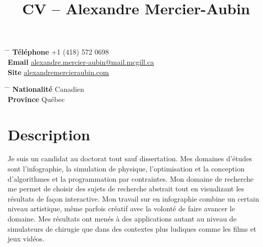 \documentclass[10pt]{article} %
\begin{document}

\title{CV -- Alexandre Mercier-Aubin} %


\parbox{0.5\textwidth}{ %
\begin{tabbing} %
\hspace{3cm} \= \hspace{4cm} \= \kill %
{\bf Téléphone} \> +1 (418) 572 0698 \\ %
{\bf Email} \> \href{mailto:alexandre.mercier-aubin@mail.mcgill.ca}{alexandre.mercier-aubin@mail.mcgill.ca} \\ %
{\bf Site} \> \href{https://alexandremercieraubin.com}{alexandremercieraubin.com} \\
\end{tabbing}}
\hfill %
\parbox{0.5\textwidth}{ %
\begin{tabbing} %
\hspace{3cm} \= \hspace{4cm} \= \kill %
{\bf Nationalité} \> Canadien \\ %
{\bf Province} \> {Québec}\\
\end{tabbing}}

\vspace{-0.7cm} 

\justifying

\section{Description}

Je suis un candidat au doctorat tout sauf dissertation. Mes domaines d'études sont l'infographie, la simulation de physique, l'optimisation et la conception
d'algorithmes et la programmation par contraintes. Mon domaine de recherche me permet de choisir des sujets de recherche abstrait tout en visualizant les résultats de façon interactive. 
Mon travail sur en infographie combine un certain niveau artistique, même parfois créatif avec la volonté de faire avancer le domaine. Mes résultats ont menés à des applications autant au niveau de simulateurs de chirugie que dans des contextes plus ludiques comme les films et jeux vidéos.
\end{document}
